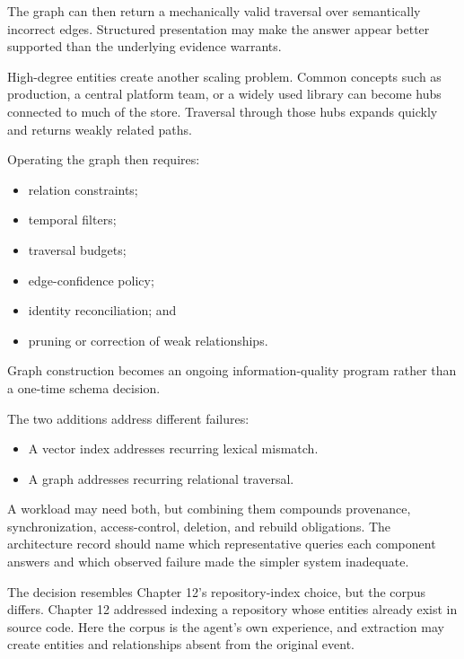 The graph can then return a mechanically valid traversal over semantically incorrect edges. Structured presentation may make the answer appear better supported than the underlying evidence warrants.

High-degree entities create another scaling problem. Common concepts such as production, a central platform team, or a widely used library can become hubs connected to much of the store. Traversal through those hubs expands quickly and returns weakly related paths.


Operating the graph then requires:

\begin{itemize}
\tightlist
\item
  relation constraints;
\item
  temporal filters;
\item
  traversal budgets;
\item
  edge-confidence policy;
\item
  identity reconciliation; and
\item
  pruning or correction of weak relationships.
\end{itemize}

Graph construction becomes an ongoing information-quality program rather than a one-time schema decision.


The two additions address different failures:

\begin{itemize}
\tightlist
\item
  A vector index addresses recurring lexical mismatch.
\item
  A graph addresses recurring relational traversal.
\end{itemize}

A workload may need both, but combining them compounds provenance, synchronization, access-control, deletion, and rebuild obligations. The architecture record should name which representative queries each component answers and which observed failure made the simpler system inadequate.

The decision resembles Chapter 12's repository-index choice, but the corpus differs. Chapter 12 addressed indexing a repository whose entities already exist in source code. Here the corpus is the agent's own experience, and extraction may create entities and relationships absent from the original event.

